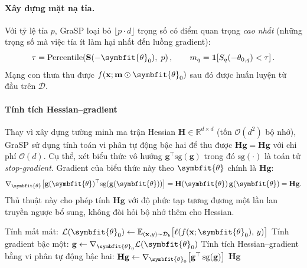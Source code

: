 \paragraph{\textbf{Xây dựng mặt nạ tỉa.}}
Với tỷ lệ tỉa $p$, GraSP loại bỏ $\lfloor p \cdot d \rfloor$ trọng số có
điểm quan trọng \emph{cao nhất} (những trọng số mà việc tỉa ít làm hại
nhất đến luồng gradient):
\begin{equation}
    \tau = \mathrm{Percentile}\!\left(\mathbf{S}(-\symbfit{\theta}_0),\; p\right),
    \qquad
    m_q = \mathbf{1}\!\left[S_q(-\theta_{0,q}) < \tau\right].
    \label{eq:mask}
\end{equation}
Mạng con thưa thu được $f(\mathbf{x};\mathbf{m}\odot\symbfit{\theta}_0)$ sau đó
được huấn luyện từ đầu trên $\mathcal{D}$.

\paragraph{\textbf{Tính tích Hessian--gradient}}
Thay vì xây dựng tường minh ma trận Hessian $\mathbf{H} \in \mathbb{R}^{d\times d}$
(tốn $\mathcal{O}(d^2)$ bộ nhớ), GraSP sử dụng tính toán vi phân tự động bậc hai
để thu được $\mathbf{Hg} = \mathbf{H}\mathbf{g}$ với chi phí $\mathcal{O}(d)$.
Cụ thể, xét biểu thức vô hướng $\mathbf{g}^\top \mathrm{sg}(\mathbf{g})$
trong đó $\mathrm{sg}(\cdot)$ là toán tử \textit{stop-gradient}.
Gradient của biểu thức này theo $\symbfit{\theta}$ chính là $\mathbf{Hg}$:
\begin{equation}
    \nabla_{\symbfit{\theta}}
    \!\left[\mathbf{g}(\symbfit{\theta})^\top
        \mathrm{sg}\!\left(\mathbf{g}(\symbfit{\theta})\right)\right]
    = \mathbf{H}(\symbfit{\theta})\,\mathbf{g}(\symbfit{\theta}) = \mathbf{Hg}.
    \label{eq:hg_trick}
\end{equation}
Thủ thuật này cho phép tính $\mathbf{Hg}$ với độ phức tạp tương đương
một lần lan truyền ngược bổ sung, không đòi hỏi bộ nhớ thêm cho Hessian.

\begin{algorithm}[H]
    \caption{Tính tích Hessian--gradient ($\mathbf{Hg}$)}
    \label{alg:hg}
    \DontPrintSemicolon
    \SetAlgoLined
    \BlankLine
    Tính mất mát:
    $\mathcal{L}(\symbfit{\theta}_0)
        \leftarrow \mathbb{E}_{(\mathbf{x},y)\sim\mathcal{D}_b}
        \bigl[\ell(f(\mathbf{x};\symbfit{\theta}_0),\, y)\bigr]$\;
    \BlankLine
    Tính gradient bậc một:
    $\mathbf{g} \leftarrow \nabla_{\symbfit{\theta}_0}\mathcal{L}(\symbfit{\theta}_0)$\;
    \BlankLine
    Tính tích Hessian--gradient bằng vi phân tự động bậc hai:
    $\mathbf{Hg} \leftarrow
        \nabla_{\symbfit{\theta}_0}
        \!\left[\mathbf{g}^{\top}\,\mathrm{sg}(\mathbf{g})\right]$
    \BlankLine
    \Return $\mathbf{Hg}$\;
\end{algorithm}

